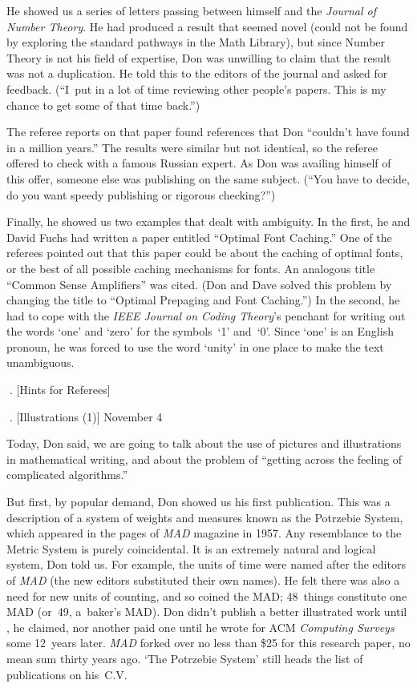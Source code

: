 He showed us a series of letters passing between himself and the {\sl Journal
of Number Theory}.  He had produced a result that seemed novel (could not
be found by exploring the standard pathways in the Math Library), but
since Number Theory is not his field of expertise, Don was unwilling to
claim that the result was not a duplication.  He told this to the editors
of the journal and asked for feedback.  (``I~put in a lot of time reviewing
other people's papers.  This is my chance to get some of that time back.'')

The referee reports on that paper found references that Don ``couldn't have
found in a million years.''  The results were similar but not identical, so
the referee offered to check with a famous Russian expert.  As Don was
availing himself of this offer, someone else was publishing on the same
subject. (``You have to decide, do you want speedy publishing or rigorous
checking?'')

Finally, he showed us two examples that dealt with ambiguity.  In the
first, he and David Fuchs had written a paper entitled ``Optimal Font
Caching.''  One of the referees pointed out that this paper could be about
the caching of optimal fonts, or the best of all possible caching
mechanisms for fonts.  An analogous title ``Common Sense Amplifiers''
was cited.
(Don and Dave solved this problem by changing the
title to ``Optimal Prepaging and Font Caching.'')  In the second, he had to
cope with the {\sl IEEE Journal on Coding Theory}'s penchant for writing out
the words `one' and `zero' for the symbols~`1' and~`0'.  Since `one' is an
English pronoun, he was forced to use the word `unity' in one place to make
the text unambiguous.

\vfill\eject
. [Hints for Referees]

\vfill\eject
. [Illustrations (1)] \pmr November 4

Today, Don said, we are going to talk about the use of pictures and
illustrations in mathematical writing, 
and about the problem of ``getting across the feeling of complicated
algorithms.''

But first,
by popular demand, Don showed
us his first publication. This was a description of a system of
weights and measures known as the Potrzebie System, which appeared
in the pages of {\sl MAD\/} magazine in 1957. Any resemblance to the Metric
System is purely coincidental. It is an extremely natural and logical
system, Don told us.  For example, the units of time were named after
the editors of {\sl MAD} (the new editors substituted their own names). He
felt there was also a need for new units of counting, and so coined the
MAD; 48~things constitute one MAD (or~49, a~baker's MAD). Don didn't
publish a better illustrated work until 
\TeXbook, he claimed, nor
another paid one until he wrote for ACM
{\sl Computing Surveys\/} some 12~years
later. {\sl MAD\/} forked over no less than \$25 for this research paper,
no mean sum thirty years ago.  
`The Potrzebie System' still heads the list of publications on his~C.V.

